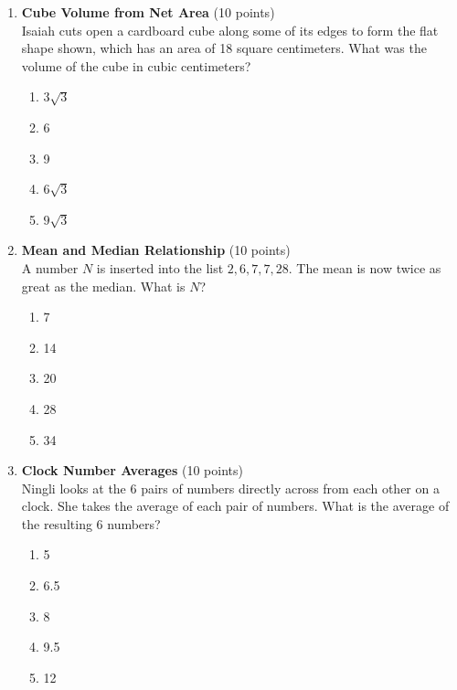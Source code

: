 \begin{enumerate}
  \newpage

  \item \textbf{Cube Volume from Net Area} (10 points)\\
  Isaiah cuts open a cardboard cube along some of its edges to form 
  the flat shape shown, which has an area of 18 square centimeters. 
  What was the volume of the cube in cubic centimeters?
  \begin{enumerate}[label=(\Alph*)]
    \item $3\sqrt{3}$
    \item 6
    \item 9
    \item $6\sqrt{3}$
    \item $9\sqrt{3}$
  \end{enumerate}
  \begin{subanswer}
  \end{subanswer}

  \item \textbf{Mean and Median Relationship} (10 points)\\
  A number $N$ is inserted into the list $2,6,7,7,28$. The mean is now twice as great as the median. What is $N$?
  \begin{enumerate}[label=(\Alph*)]
    \item 7
    \item 14
    \item 20
    \item 28
    \item 34
  \end{enumerate}
  \begin{subanswer}
  \end{subanswer}


  \newpage




  \item \textbf{Clock Number Averages} (10 points)\\
  Ningli looks at the 6 pairs of numbers directly 
  across from each other on a clock. She takes the 
  average of each pair of numbers. What is the 
  average of the resulting 6 numbers?
  \begin{enumerate}[label=(\Alph*)]
    \item 5
    \item 6.5
    \item 8
    \item 9.5
    \item 12
  \end{enumerate}
  \begin{subanswer}
  \end{subanswer}



\end{enumerate}

